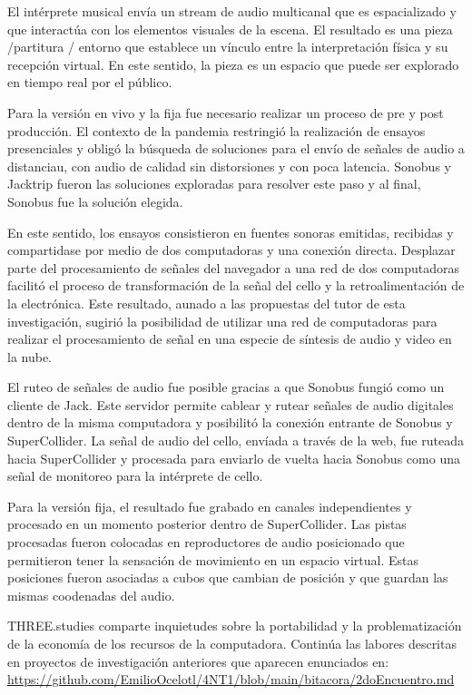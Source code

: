 El intérprete musical envía un stream de audio multicanal que es espacializado y que interactúa con los elementos visuales de la escena. El resultado es una pieza /partitura / entorno que establece un vínculo entre la interpretación física y su recepción virtual. En este sentido, la pieza es un espacio que puede ser explorado en tiempo real por el público. 

Para la versión en vivo y la fija fue necesario realizar un proceso de pre y post producción. El contexto de la pandemia restringió la realización de ensayos presenciales y obligó la búsqueda de soluciones para el envío de señales de audio a distanciau, con audio de calidad sin distorsiones y con poca latencia. Sonobus y Jacktrip fueron las soluciones exploradas para resolver este paso y al final, Sonobus fue la solución elegida. 

En este sentido, los ensayos consistieron en fuentes sonoras emitidas, recibidas y compartidase por medio de dos computadoras y una conexión directa. Desplazar parte del procesamiento de señales del navegador a una red de dos computadoras facilitó el proceso de transformación de la señal del cello y la retroalimentación de la electrónica. Este resultado, aunado a las propuestas del tutor de esta investigación, sugirió la posibilidad de utilizar una red de computadoras para realizar el procesamiento de señal en una especie de síntesis de audio y video en la nube. 

El ruteo de señales de audio fue posible gracias a que Sonobus fungió como un cliente de Jack. Este servidor permite cablear y rutear señales de audio digitales dentro de la misma computadora y posibilitó la conexión entrante de Sonobus y SuperCollider. La señal de audio del cello, envíada a través de la web, fue ruteada hacia SuperCollider y procesada para enviarlo de vuelta hacia Sonobus como una señal de monitoreo para la intérprete de cello. 

Para la versión fija, el resultado fue grabado en canales independientes y procesado en un momento posterior dentro de SuperCollider. Las pistas procesadas fueron colocadas en reproductores de audio posicionado que permitieron tener la sensación de movimiento en un espacio virtual. Estas posiciones fueron asociadas a cubos que cambian de posición y que guardan las mismas coodenadas del audio.

THREE.studies comparte inquietudes sobre la portabilidad y la problematización de la economía de los recursos de la computadora. Continúa las labores descritas en proyectos de investigación anteriores que aparecen enunciados en: \url{https://github.com/EmilioOcelotl/4NT1/blob/main/bitacora/2doEncuentro.md}

